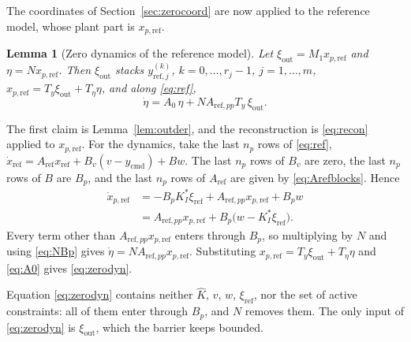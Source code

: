 \documentclass[lettersize,journal]{IEEEtran}
\newtheorem{lemma}{Lemma}
\newcommand{\Kh}{\hat{K}}
\newcommand{\xr}{x_{\mathrm{ref}}}
\newcommand{\xpr}{x_{p,\mathrm{ref}}}
\newcommand{\Ar}{A_{\mathrm{ref}}}
\newcommand{\App}{A_{\mathrm{ref},pp}}
\newcommand{\ycmd}{y_{\mathrm{cmd}}}
\begin{document}
The coordinates of Section~\ref{sec:zerocoord} are now applied to the reference model, whose plant part is $\xpr$.

\begin{lemma}[Zero dynamics of the reference model] \label{lem:zero}
Let $\xi_{\mathrm{out}}=M_1\xpr$ and $\eta=N\xpr$. Then $\xi_{\mathrm{out}}$ stacks $y^{(k)}_{\mathrm{ref},j}$, $k=0,\dots,r_j-1$, $j=1,\dots,m$, $\xpr=T_y\xi_{\mathrm{out}}+T_\eta\eta$, and along \eqref{eq:ref},
\begin{equation}
\dot\eta = A_0\,\eta + N\App T_y\,\xi_{\mathrm{out}}. \label{eq:zerodyn}
\end{equation}
\end{lemma}
\begin{IEEEproof}
The first claim is Lemma~\ref{lem:outder}, and the reconstruction is \eqref{eq:recon} applied to $\xpr$. For the dynamics, take the last $n_p$ rows of \eqref{eq:ref}, $\dot x_{\mathrm{ref}}=\Ar\xr+B_v(v-\ycmd)+Bw$. The last $n_p$ rows of $B_v$ are zero, the last $n_p$ rows of $B$ are $B_p$, and the last $n_p$ rows of $\Ar$ are given by \eqref{eq:Arefblocks}. Hence
\begin{align*}
\dot x_{p,\mathrm{ref}} &= -B_pK_I^*\xi_{\mathrm{ref}} + \App\xpr + B_pw\\
&= \App\xpr + B_p\big(w-K_I^*\xi_{\mathrm{ref}}\big).
\end{align*}
Every term other than $\App\xpr$ enters through $B_p$, so multiplying by $N$ and using \eqref{eq:NBp} gives $\dot\eta=N\App\xpr$. Substituting $\xpr=T_y\xi_{\mathrm{out}}+T_\eta\eta$ and \eqref{eq:A0} gives \eqref{eq:zerodyn}.
\end{IEEEproof}

Equation \eqref{eq:zerodyn} contains neither $\Kh$, $v$, $w$, $\xi_{\mathrm{ref}}$, nor the set of active constraints: all of them enter through $B_p$, and $N$ removes them. The only input of \eqref{eq:zerodyn} is $\xi_{\mathrm{out}}$, which the barrier keeps bounded.
\end{document}
